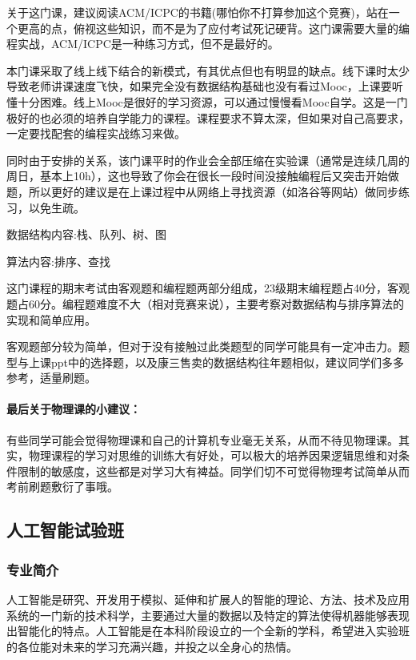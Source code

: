 \documentclass[
decoration,  %
]{qyxf-book}
\begin{document}
\begin{itemize}
	关于这门课，建议阅读ACM/ICPC的书籍(哪怕你不打算参加这个竞赛)，站在一个更高的点，俯视这些知识，而不是为了应付考试死记硬背。这门课需要大量的编程实战，ACM/ICPC是一种练习方式，但不是最好的。	
	
	本门课采取了线上线下结合的新模式，有其优点但也有明显的缺点。线下课时太少导致老师讲课速度飞快，如果完全没有数据结构基础也没有看过Mooc，上课要听懂十分困难。线上Mooc是很好的学习资源，可以通过慢慢看Mooc自学。这是一门极好的也必须的培养自学能力的课程。课程要求不算太深，但如果对自己高要求，一定要找配套的编程实战练习来做。
	
	同时由于安排的关系，该门课平时的作业会全部压缩在实验课（通常是连续几周的周日，基本上10h），这也导致了你会在很长一段时间没接触编程后又突击开始做题，所以更好的建议是在上课过程中从网络上寻找资源（如洛谷等网站）做同步练习，以免生疏。
	
	数据结构内容:栈、队列、树、图

	算法内容:排序、查找
	
	这门课程的期末考试由客观题和编程题两部分组成，23级期末编程题占40分，客观题占60分。编程题难度不大（相对竞赛来说），主要考察对数据结构与排序算法的实现和简单应用。

	客观题部分较为简单，但对于没有接触过此类题型的同学可能具有一定冲击力。题型与上课ppt中的选择题，以及康三售卖的数据结构往年题相似，建议同学们多多参考，适量刷题。
	
\end{itemize}
\paragraph{最后关于物理课的小建议：}


有些同学可能会觉得物理课和自己的计算机专业毫无关系，从而不待见物理课。其实，物理课程的学习对思维的训练大有好处，可以极大的培养因果逻辑思维和对条件限制的敏感度，这些都是对学习大有裨益。同学们切不可觉得物理考试简单从而考前刷题敷衍了事哦。

\subsection{人工智能试验班}
\subsubsection{专业简介}
人工智能是研究、开发用于模拟、延伸和扩展人的智能的理论、方法、技术及应用系统的一门新的技术科学，主要通过大量的数据以及特定的算法使得机器能够表现出智能化的特点。人工智能是在本科阶段设立的一个全新的学科，希望进入实验班的各位能对未来的学习充满兴趣，并投之以全身心的热情。
\end{document}
